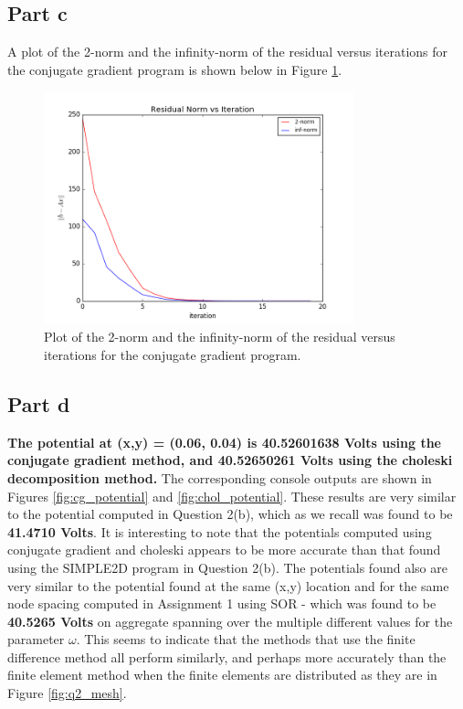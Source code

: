 \documentclass[11pt]{amsart}
\begin{document}
\pagebreak

\subsection*{Part c}
A plot of the 2-norm and the infinity-norm of the residual versus iterations for the conjugate gradient program is shown below in Figure \ref{fig:q3_residual}.
\begin{figure}[h!]
   \includegraphics[width=0.8\textwidth]{assets/q3_residual}
   \caption{Plot of the 2-norm and the infinity-norm of the residual versus iterations for the conjugate gradient program.}
   \label{fig:q3_residual}
\end{figure}

\subsection*{Part d}
\textbf{The potential at (x,y) = (0.06, 0.04) is 40.52601638 Volts using the conjugate gradient method, and 40.52650261 Volts using the choleski decomposition method.} The corresponding console outputs are shown in Figures \ref{fig:cg_potential} and \ref{fig:chol_potential}. These results are very similar to the potential computed in Question 2(b), which as we recall was found to be \textbf{41.4710 Volts}. It is interesting to note that the potentials computed using conjugate gradient and choleski appears to be more accurate than that found using the SIMPLE2D program in Question 2(b). The potentials found also are very similar to the potential found at the same (x,y) location and for the same node spacing computed in Assignment 1 using SOR - which was found to be \textbf{40.5265 Volts} on aggregate spanning over the multiple different values for the parameter $\omega$. This seems to indicate that the methods that use the finite difference method all perform similarly, and perhaps more accurately than the finite element method when the finite elements are distributed as they are in Figure \ref{fig:q2_mesh}.
\end{document}
